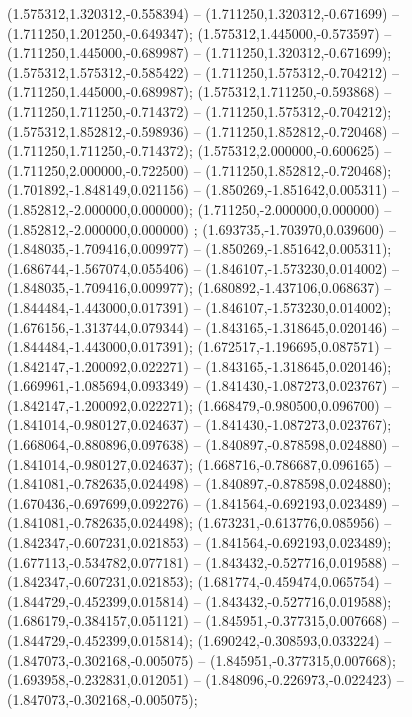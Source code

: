  (1.575312,1.320312,-0.558394) -- (1.711250,1.320312,-0.671699) -- (1.711250,1.201250,-0.649347);
 (1.575312,1.445000,-0.573597) -- (1.711250,1.445000,-0.689987) -- (1.711250,1.320312,-0.671699);
 (1.575312,1.575312,-0.585422) -- (1.711250,1.575312,-0.704212) -- (1.711250,1.445000,-0.689987);
 (1.575312,1.711250,-0.593868) -- (1.711250,1.711250,-0.714372) -- (1.711250,1.575312,-0.704212);
 (1.575312,1.852812,-0.598936) -- (1.711250,1.852812,-0.720468) -- (1.711250,1.711250,-0.714372);
 (1.575312,2.000000,-0.600625) -- (1.711250,2.000000,-0.722500) -- (1.711250,1.852812,-0.720468);
 (1.701892,-1.848149,0.021156) -- (1.850269,-1.851642,0.005311) -- (1.852812,-2.000000,0.000000);
 (1.711250,-2.000000,0.000000) -- (1.852812,-2.000000,0.000000) ;
 (1.693735,-1.703970,0.039600) -- (1.848035,-1.709416,0.009977) -- (1.850269,-1.851642,0.005311);
 (1.686744,-1.567074,0.055406) -- (1.846107,-1.573230,0.014002) -- (1.848035,-1.709416,0.009977);
 (1.680892,-1.437106,0.068637) -- (1.844484,-1.443000,0.017391) -- (1.846107,-1.573230,0.014002);
 (1.676156,-1.313744,0.079344) -- (1.843165,-1.318645,0.020146) -- (1.844484,-1.443000,0.017391);
 (1.672517,-1.196695,0.087571) -- (1.842147,-1.200092,0.022271) -- (1.843165,-1.318645,0.020146);
 (1.669961,-1.085694,0.093349) -- (1.841430,-1.087273,0.023767) -- (1.842147,-1.200092,0.022271);
 (1.668479,-0.980500,0.096700) -- (1.841014,-0.980127,0.024637) -- (1.841430,-1.087273,0.023767);
 (1.668064,-0.880896,0.097638) -- (1.840897,-0.878598,0.024880) -- (1.841014,-0.980127,0.024637);
 (1.668716,-0.786687,0.096165) -- (1.841081,-0.782635,0.024498) -- (1.840897,-0.878598,0.024880);
 (1.670436,-0.697699,0.092276) -- (1.841564,-0.692193,0.023489) -- (1.841081,-0.782635,0.024498);
 (1.673231,-0.613776,0.085956) -- (1.842347,-0.607231,0.021853) -- (1.841564,-0.692193,0.023489);
 (1.677113,-0.534782,0.077181) -- (1.843432,-0.527716,0.019588) -- (1.842347,-0.607231,0.021853);
 (1.681774,-0.459474,0.065754) -- (1.844729,-0.452399,0.015814) -- (1.843432,-0.527716,0.019588);
 (1.686179,-0.384157,0.051121) -- (1.845951,-0.377315,0.007668) -- (1.844729,-0.452399,0.015814);
 (1.690242,-0.308593,0.033224) -- (1.847073,-0.302168,-0.005075) -- (1.845951,-0.377315,0.007668);
 (1.693958,-0.232831,0.012051) -- (1.848096,-0.226973,-0.022423) -- (1.847073,-0.302168,-0.005075);
